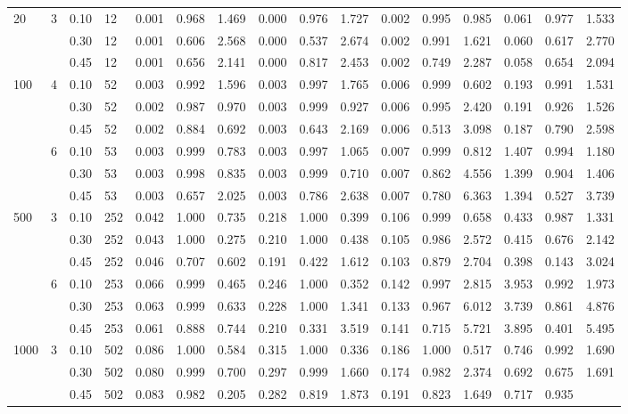 \documentclass[thesis=B,english]{FITthesis}[2012/10/20]
\begin{document}
\begin{table}[h!]
\begin{adjustbox}{angle=90}
{\begin{tabular}{ll|l|l|r|r|r|r|r|r|r|r|r|r|r|r|}
                        20   & 3 & 0.10 & 12  &    0.001 &  0.968 &  1.469 &   0.000 &  0.976 &  1.727 &  0.002 &  0.995 &  0.985 &  0.061 &  0.977 &   1.533 \\     &   & 0.30 & 12  &    0.001 &  0.606 &  2.568 &   0.000 &  0.537 &  2.674 &  0.002 &  0.991 &  1.621 &  0.060 &  0.617 &   2.770 \\     &   & 0.45 & 12  &    0.001 &  0.656 &  2.141 &   0.000 &  0.817 &  2.453 &  0.002 &  0.749 &  2.287 &  0.058 &  0.654 &   2.094 \\100  & 4 & 0.10 & 52  &    0.003 &  0.992 &  1.596 &   0.003 &  0.997 &  1.765 &  0.006 &  0.999 &  0.602 &  0.193 &  0.991 &   1.531 \\     &   & 0.30 & 52  &    0.002 &  0.987 &  0.970 &   0.003 &  0.999 &  0.927 &  0.006 &  0.995 &  2.420 &  0.191 &  0.926 &   1.526 \\     &   & 0.45 & 52  &    0.002 &  0.884 &  0.692 &   0.003 &  0.643 &  2.169 &  0.006 &  0.513 &  3.098 &  0.187 &  0.790 &   2.598 \\     & 6 & 0.10 & 53  &    0.003 &  0.999 &  0.783 &   0.003 &  0.997 &  1.065 &  0.007 &  0.999 &  0.812 &  1.407 &  0.994 &   1.180 \\     &   & 0.30 & 53  &    0.003 &  0.998 &  0.835 &   0.003 &  0.999 &  0.710 &  0.007 &  0.862 &  4.556 &  1.399 &  0.904 &   1.406 \\     &   & 0.45 & 53  &    0.003 &  0.657 &  2.025 &   0.003 &  0.786 &  2.638 &  0.007 &  0.780 &  6.363 &  1.394 &  0.527 &   3.739 \\500  & 3 & 0.10 & 252 &    0.042 &  1.000 &  0.735 &   0.218 &  1.000 &  0.399 &  0.106 &  0.999 &  0.658 &  0.433 &  0.987 &   1.331 \\     &   & 0.30 & 252 &    0.043 &  1.000 &  0.275 &   0.210 &  1.000 &  0.438 &  0.105 &  0.986 &  2.572 &  0.415 &  0.676 &   2.142 \\     &   & 0.45 & 252 &    0.046 &  0.707 &  0.602 &   0.191 &  0.422 &  1.612 &  0.103 &  0.879 &  2.704 &  0.398 &  0.143 &   3.024 \\     & 6 & 0.10 & 253 &    0.066 &  0.999 &  0.465 &   0.246 &  1.000 &  0.352 &  0.142 &  0.997 &  2.815 &  3.953 &  0.992 &   1.973 \\     &   & 0.30 & 253 &    0.063 &  0.999 &  0.633 &   0.228 &  1.000 &  1.341 &  0.133 &  0.967 &  6.012 &  3.739 &  0.861 &   4.876 \\     &   & 0.45 & 253 &    0.061 &  0.888 &  0.744 &   0.210 &  0.331 &  3.519 &  0.141 &  0.715 &  5.721 &  3.895 &  0.401 &   5.495 \\1000 & 3 & 0.10 & 502 &    0.086 &  1.000 &  0.584 &   0.315 &  1.000 &  0.336 &  0.186 &  1.000 &  0.517 &  0.746 &  0.992 &   1.690 \\     &   & 0.30 & 502 &    0.080 &  0.999 &  0.700 &   0.297 &  0.999 &  1.660 &  0.174 &  0.982 &  2.374 &  0.692 &  0.675 &   1.691 \\     &   & 0.45 & 502 &    0.083 &  0.982 &  0.205 &   0.282 &  0.819 &  1.873 &  0.191 &  0.823 &  1.649 &  0.717 &  0.935 & 
\end{tabular}}
\end{adjustbox}
\end{table}
\end{document}
